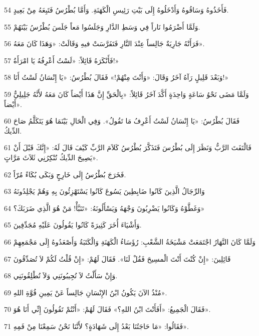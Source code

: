 \par 54 فَأَخَذُوهُ وَسَاقُوهُ وَأَدْخَلُوهُ إِلَى بَيْتِ رَئِيسِ الْكَهَنَةِ. وَأَمَّا بُطْرُسُ فَتَبِعَهُ مِنْ بَعِيدٍ.
\par 55 وَلَمَّا أَضْرَمُوا نَاراً فِي وَسَطِ الدَّارِ وَجَلَسُوا مَعاً جَلَسَ بُطْرُسُ بَيْنَهُمْ.
\par 56 فَرَأَتْهُ جَارِيَةٌ جَالِساً عِنْدَ النَّارِ فَتَفَرَّسَتْ فيهِ وَقَالَتْ: «وَهَذَا كَانَ مَعَهُ».
\par 57 فَأَنْكَرَهُ قَائِلاً: «لَسْتُ أَعْرِفُهُ يَا امْرَأَةُ!»
\par 58 وَبَعْدَ قَلِيلٍ رَآهُ آخَرُ وَقَالَ: «وَأَنْتَ مِنْهُمْ!» فَقَالَ بُطْرُسُ: «يَا إِنْسَانُ لَسْتُ أَنَا!»
\par 59 وَلَمَّا مَضَى نَحْوُ سَاعَةٍ وَاحِدَةٍ أَكَّدَ آخَرُ قَائِلاً: «بِالْحَقِّ إِنَّ هَذَا أَيْضاً كَانَ مَعَهُ لأَنَّهُ جَلِيلِيٌّ أَيْضاً».
\par 60 فَقَالَ بُطْرُسُ: «يَا إِنْسَانُ لَسْتُ أَعْرِفُ مَا تَقُولُ». وَفِي الْحَالِ بَيْنَمَا هُوَ يَتَكَلَّمُ صَاحَ الدِّيكُ.
\par 61 فَالْتَفَتَ الرَّبُّ وَنَظَرَ إِلَى بُطْرُسَ فَتَذَكَّرَ بُطْرُسُ كَلاَمَ الرَّبِّ كَيْفَ قَالَ لَهُ: «إِنَّكَ قَبْلَ أَنْ يَصِيحَ الدِّيكُ تُنْكِرُنِي ثَلاَثَ مَرَّاتٍ».
\par 62 فَخَرَجَ بُطْرُسُ إِلَى خَارِجٍ وَبَكَى بُكَاءً مُرّاً.
\par 63 وَالرِّجَالُ الَّذِينَ كَانُوا ضَابِطِينَ يَسُوعَ كَانُوا يَسْتَهْزِئُونَ بِهِ وَهُمْ يَجْلِدُونَهُ
\par 64 وَغَطَّوْهُ وَكَانُوا يَضْرِبُونَ وَجْهَهُ وَيَسْأَلُونَهُ: «تَنَبَّأْ! مَنْ هُوَ الَّذِي ضَرَبَكَ؟»
\par 65 وَأَشْيَاءَ أُخَرَ كَثِيرَةً كَانُوا يَقُولُونَ عَلَيْهِ مُجَدِّفِينَ.
\par 66 وَلَمَّا كَانَ النَّهَارُ اجْتَمَعَتْ مَشْيَخَةُ الشَّعْبِ: رُؤَسَاءُ الْكَهَنَةِ وَالْكَتَبَةُ وَأَصْعَدُوهُ إِلَى مَجْمَعِهِمْ
\par 67 قَائِلِينَ: «إِنْ كُنْتَ أَنْتَ الْمسِيحَ فَقُلْ لَنَا». فَقَالَ لَهُمْ: «إِنْ قُلْتُ لَكُمْ لاَ تُصَدِّقُونَ
\par 68 وَإِنْ سَأَلْتُ لاَ تُجِيبُونَنِي وَلاَ تُطْلِقُونَنِي.
\par 69 مُنْذُ الآنَ يَكُونُ ابْنُ الإِنْسَانِ جَالِساً عَنْ يَمِينِ قُوَّةِ اللهِ».
\par 70 فَقَالَ الْجَمِيعُ: «أَفَأَنْتَ ابْنُ اللهِ؟» فَقَالَ لَهُمْ: «أَنْتُمْ تَقُولُونَ إِنِّي أَنَا هُوَ».
\par 71 فَقَالُوا: «مَا حَاجَتُنَا بَعْدُ إِلَى شَهَادَةٍ؟ لأَنَّنَا نَحْنُ سَمِعْنَا مِنْ فَمِهِ».

